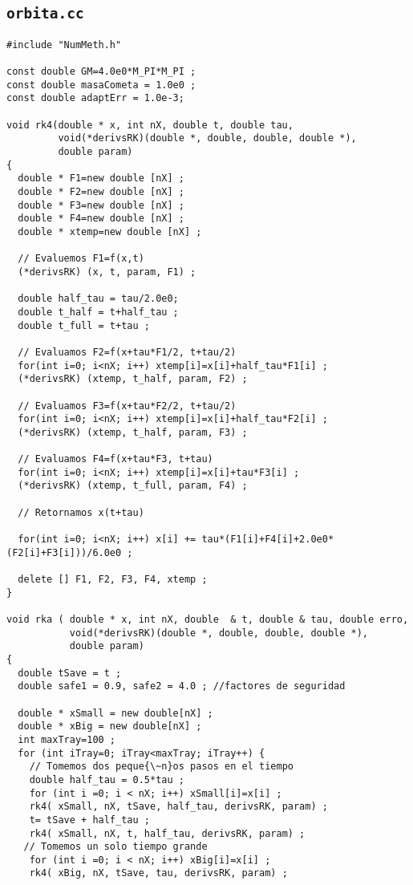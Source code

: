 \subsection{\tt orbita.cc}
\begin{verbatim}
#include "NumMeth.h"

const double GM=4.0e0*M_PI*M_PI ;
const double masaCometa = 1.0e0 ;
const double adaptErr = 1.0e-3;

void rk4(double * x, int nX, double t, double tau,
         void(*derivsRK)(double *, double, double, double *),
         double param)
{
  double * F1=new double [nX] ;
  double * F2=new double [nX] ;
  double * F3=new double [nX] ;
  double * F4=new double [nX] ;
  double * xtemp=new double [nX] ;

  // Evaluemos F1=f(x,t)
  (*derivsRK) (x, t, param, F1) ;

  double half_tau = tau/2.0e0;
  double t_half = t+half_tau ;
  double t_full = t+tau ;

  // Evaluamos F2=f(x+tau*F1/2, t+tau/2)
  for(int i=0; i<nX; i++) xtemp[i]=x[i]+half_tau*F1[i] ;
  (*derivsRK) (xtemp, t_half, param, F2) ;
 
  // Evaluamos F3=f(x+tau*F2/2, t+tau/2)
  for(int i=0; i<nX; i++) xtemp[i]=x[i]+half_tau*F2[i] ;
  (*derivsRK) (xtemp, t_half, param, F3) ;
 
  // Evaluamos F4=f(x+tau*F3, t+tau)
  for(int i=0; i<nX; i++) xtemp[i]=x[i]+tau*F3[i] ;
  (*derivsRK) (xtemp, t_full, param, F4) ;
 
  // Retornamos x(t+tau)

  for(int i=0; i<nX; i++) x[i] += tau*(F1[i]+F4[i]+2.0e0*(F2[i]+F3[i]))/6.0e0 ;
 
  delete [] F1, F2, F3, F4, xtemp ;
}

void rka ( double * x, int nX, double  & t, double & tau, double erro, 
           void(*derivsRK)(double *, double, double, double *),
           double param)
{
  double tSave = t ;
  double safe1 = 0.9, safe2 = 4.0 ; //factores de seguridad

  double * xSmall = new double[nX] ;
  double * xBig = new double[nX] ;
  int maxTray=100 ;
  for (int iTray=0; iTray<maxTray; iTray++) {
    // Tomemos dos peque{\~n}os pasos en el tiempo
    double half_tau = 0.5*tau ;
    for (int i =0; i < nX; i++) xSmall[i]=x[i] ;
    rk4( xSmall, nX, tSave, half_tau, derivsRK, param) ;
    t= tSave + half_tau ;
    rk4( xSmall, nX, t, half_tau, derivsRK, param) ;
   // Tomemos un solo tiempo grande
    for (int i =0; i < nX; i++) xBig[i]=x[i] ;
    rk4( xBig, nX, tSave, tau, derivsRK, param) ;


\end{verbatim}

